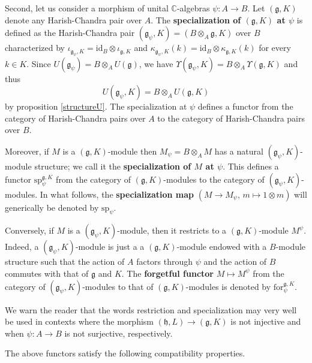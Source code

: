 \documentclass{amsart}
\theoremstyle{definition}
\begin{document}
Second, let us consider a morphism of unital $\mathbb{C}$-algebras $\psi : A \to B$. Let $(\mathfrak{g},K)$ denote any Harish-Chandra pair over $A$. The \textbf{specialization of $(\mathfrak{g},K)$ at $\psi$} is defined as the Harish-Chandra pair $(\mathfrak{g}_\psi,K) = (B \otimes_A\mathfrak{g}, K)$ over $B$ characterized by $\iota_{\mathfrak{g}_\psi,K} = \mathrm{id}_B \otimes \iota_{\mathfrak{g},K}$ and $\kappa_{\mathfrak{g}_\psi,K}(k) = \mathrm{id}_B \otimes \kappa_{\mathfrak{g},K}(k)$ for every $k \in K$. Since $U(\mathfrak{g}_\psi) = B \otimes_A U(\mathfrak{g})$, we have $\Upsilon(\mathfrak{g}_\psi,K) = B \otimes_A \Upsilon(\mathfrak{g},K)$ and thus \begin{equation}\label{BtensorA}
    U(\mathfrak{g}_\psi,K) = B \otimes_A U(\mathfrak{g},K)
\end{equation} by proposition \ref{structureU}. The specialization at $\psi$ defines a functor from the category of Harish-Chandra pairs over $A$ to the category of Harish-Chandra pairs over $B$.

Moreover, if $M$ is a $(\mathfrak{g},K)$-module then $M_\psi = B \otimes_A M$ has a natural $(\mathfrak{g}_\psi, K)$-module structure; we call it the \textbf{specialization of $M$ at $\psi$}. This defines a functor $\mathrm{sp}_\psi^{\mathfrak{g},K}$ from the category of $(\mathfrak{g},K)$-modules to the category of $(\mathfrak{g}_\psi,K)$-modules. In what follows, the \textbf{specialization map} $(M \to M_\psi, \, m \mapsto 1 \otimes m)$ will generically be denoted by $\mathrm{sp}_\psi$.

Conversely, if $M$ is a $(\mathfrak{g}_\psi, K)$-module, then it restricts to a $(\mathfrak{g}, K)$-module $M^\psi$. Indeed, a $(\mathfrak{g}_\psi, K)$-module is just a a $(\mathfrak{g}, K)$-module endowed with a $B$-module structure such that the action of $A$ factors through $\psi$ and the action of $B$ commutes with that of $\mathfrak{g}$ and $K$. The \textbf{forgetful functor} $M \mapsto M^\psi$ from the category of $(\mathfrak{g}_\psi, K)$-modules to that of $(\mathfrak{g}, K)$-modules is denoted by $\mathrm{for}_\psi^{\mathfrak{g},K}$.

We warn the reader that the words restriction and specialization may very well be used in contexts where the morphism $(\mathfrak{h},L) \to (\mathfrak{g},K)$ is not injective and when $\psi : A \to B$ is not surjective, respectively.

The above functors satisfy the following compatibility properties.
\end{document}
